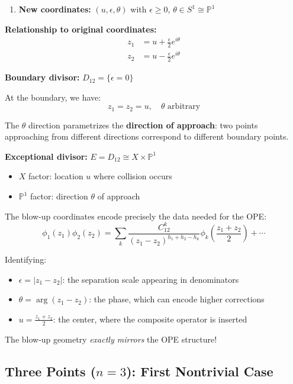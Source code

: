 \begin{example}
\begin{enumerate}
\item \textbf{New coordinates:} $(u, \epsilon, \theta)$ with $\epsilon \geq 0$, $\theta \in S^1 \cong \mathbb{P}^1$
\end{enumerate}

\textbf{Relationship to original coordinates:}
\begin{align}
z_1 &= u + \frac{\epsilon}{2} e^{i\theta} \label{eq:blowup-z1}\\
z_2 &= u - \frac{\epsilon}{2} e^{i\theta} \label{eq:blowup-z2}
\end{align}

\textbf{Boundary divisor:} $D_{12} = \{\epsilon = 0\}$

At the boundary, we have:
$$z_1 = z_2 = u, \quad \theta \text{ arbitrary}$$

The $\theta$ direction parametrizes the \textbf{direction of approach}: two points
approaching from different directions correspond to different boundary points.

\textbf{Exceptional divisor:} $E = D_{12} \cong X \times \mathbb{P}^1$
\begin{itemize}
\item $X$ factor: location $u$ where collision occurs
\item $\mathbb{P}^1$ factor: direction $\theta$ of approach
\end{itemize}
\end{example}

\begin{remark}
The blow-up coordinates encode precisely the data needed for the OPE:
$$\phi_1(z_1)\phi_2(z_2) = \sum_k \frac{C_{12}^k}{(z_1-z_2)^{h_1+h_2-h_k}} \phi_k\left(
\frac{z_1+z_2}{2}\right) + \cdots$$

Identifying:
\begin{itemize}
\item $\epsilon = |z_1 - z_2|$: the separation scale appearing in denominators
\item $\theta = \arg(z_1 - z_2)$: the phase, which can encode higher corrections
\item $u = \frac{z_1 + z_2}{2}$: the center, where the composite operator is inserted
\end{itemize}

The blow-up geometry \emph{exactly mirrors} the OPE structure!
\end{remark}

\subsection{Three Points ($n=3$): First Nontrivial Case}

